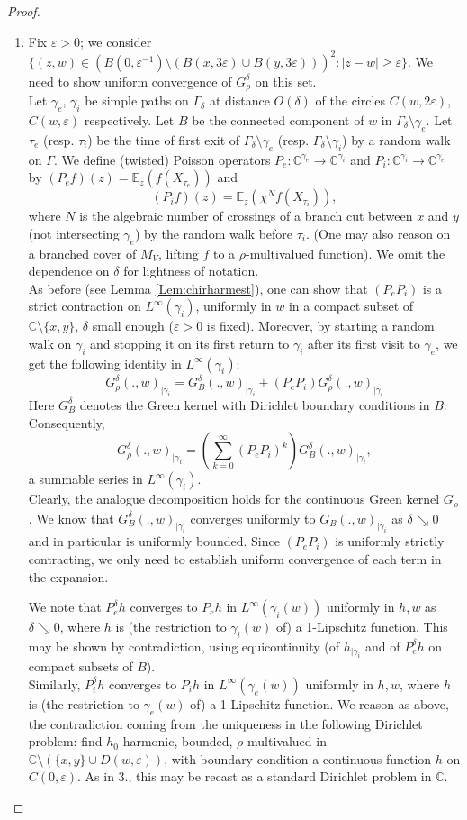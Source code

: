 \documentclass[10pt]{article}
\newcommand{\C}{\mathbb{C}}
\newcommand{\E}{\mathbb{E}}
\newcommand{\eps}{\varepsilon}
\begin{document}
\begin{proof}
\begin{enumerate}
\item Fix $\eps>0$; we consider $\{(z,w)\in (B(0,\eps^{-1})\setminus (B(x,3\eps)\cup B(y,3\eps)))^2:|z-w|\geq\eps\}$. We need to show uniform convergence of $G^\delta_\rho$ on this set.\\
Let $\gamma_e$, $\gamma_i$ be simple paths on $\Gamma_\delta$ at distance $O(\delta)$ of the circles $C(w,2\eps)$, $C(w,\eps)$ respectively. Let $B$ be the connected component of $w$ in $\Gamma_\delta\setminus\gamma_e$. Let $\tau_e$ (resp. $\tau_i$) be the time of first exit of $\Gamma_\delta\setminus\gamma_e$ (resp. $\Gamma_\delta\setminus\gamma_i$) by a random walk on $\Gamma$. We define (twisted) Poisson operators $P_e:\C^{\gamma_e}\rightarrow\C^{\gamma_i}$ and $P_i:\C^{\gamma_i}\rightarrow\C^{\gamma_e}$ by $(P_ef)(z)=\E_z(f(X_{\tau_e}))$ and 
$$(P_if)(z)=\E_z(\chi^Nf(X_{\tau_i})),$$
where $N$ is the algebraic number of crossings of a branch cut between $x$ and $y$ (not intersecting $\gamma_e$) by the random walk before $\tau_i$. (One may also reason on a branched cover of $M_V$, lifting $f$ to a $\rho$-multivalued function). We omit the dependence on $\delta$ for lightness of notation.\\
As before (see Lemma \ref{Lem:chirharmest}), one can show that $(P_eP_i)$ is a strict contraction on $L^\infty(\gamma_i)$, uniformly in $w$ in a compact subset of $\C\setminus\{x,y\}$, $\delta$ small enough ($\eps>0$ is fixed). Moreover, by starting a random walk on $\gamma_i$ and stopping it on its first return to $\gamma_i$ after its first visit to $\gamma_e$, we get 
the following identity in $L^\infty(\gamma_i)$:
$$G_\rho^\delta(.,w)_{|\gamma_i}=G^\delta_B(.,w)_{|\gamma_i}+(P_eP_i)G_\rho^\delta(.,w)_{|\gamma_i}$$
Here $G^\delta_B$ denotes the Green kernel with Dirichlet boundary conditions in $B$. Consequently,
$$G_\rho^\delta(.,w)_{|\gamma_i}=(\sum_{k=0}^\infty(P_eP_i)^k)G^\delta_B(.,w)_{|\gamma_i},$$
a summable series in $L^\infty(\gamma_i)$.\\
Clearly, the analogue decomposition holds for the continuous Green kernel $G_\rho$. We know that $G^\delta_B(.,w)_{|\gamma_i}$ converges uniformly to $G_B(.,w)_{|\gamma_i}$ as $\delta\searrow 0$ and in particular is uniformly bounded. Since $(P_eP_i)$ is uniformly strictly contracting, we only need to establish uniform convergence of each term in the expansion.

We note that $P_e^\delta h$ converges to $P_eh$ in $L^\infty(\gamma_i(w))$ uniformly in $h,w$ as $\delta\searrow 0$, where $h$ is (the restriction to $\gamma_i(w)$ of) a 1-Lipschitz function. This may be shown by contradiction, using equicontinuity (of $h_{|\gamma_i}$ and of $P_e^\delta h$ on compact subsets of $B$). \\
Similarly, $P_i^\delta h$ converges to $P_ih$ in $L^\infty(\gamma_e(w))$ uniformly in $h,w$, where $h$ is (the restriction to $\gamma_e(w)$ of) a 1-Lipschitz function. We reason as above, the contradiction coming from the uniqueness in the following Dirichlet problem: find $h_0$ harmonic, bounded, $\rho$-multivalued in $\C\setminus(\{x,y\}\cup D(w,\eps))$, with boundary condition a continuous function $h$ on $C(0,\eps)$. As in 3., this may be recast as a standard Dirichlet problem in $\C$.


\end{enumerate}
\end{proof}
\end{document}

